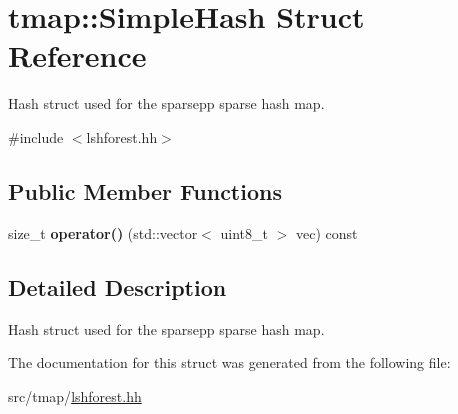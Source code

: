 \hypertarget{structtmap_1_1SimpleHash}{}\section{tmap\+:\+:Simple\+Hash Struct Reference}
\label{structtmap_1_1SimpleHash}


Hash struct used for the sparsepp sparse hash map.  




{\ttfamily \#include $<$lshforest.\+hh$>$}

\subsection*{Public Member Functions}
\begin{DoxyCompactItemize}
\item 
\mbox{\label{structtmap_1_1SimpleHash_a2246e182ae49e4ff363d6c3344aa97cf}} 
size\+\_\+t {\bfseries operator()} (std\+::vector$<$ uint8\+\_\+t $>$ vec) const
\end{DoxyCompactItemize}


\subsection{Detailed Description}
Hash struct used for the sparsepp sparse hash map. 

The documentation for this struct was generated from the following file\+:\begin{DoxyCompactItemize}
\item 
src/tmap/\hyperlink{lshforest_8hh}{lshforest.\+hh}\end{DoxyCompactItemize}
